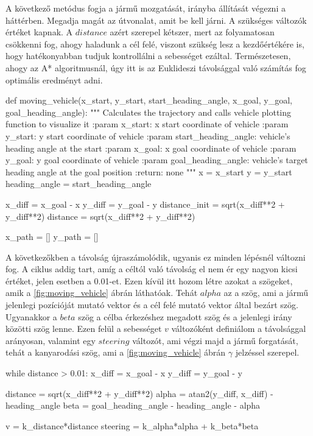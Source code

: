 \bigskip

A következő metódus fogja a jármű mozgatását, irányba állítását végezni a háttérben. Megadja magát az útvonalat, amit be kell járni. A szükséges változók értéket kapnak. A $ distance $ azért szerepel kétszer, mert az folyamatosan csökkenni fog, ahogy haladunk a cél felé, viszont szükség lesz a kezdőértékére is, hogy hatékonyabban tudjuk kontrollálni a sebességet ezáltal. Természetesen, ahogy az A* algoritmusnál, úgy itt is az Euklideszi távolsággal való számítás fog optimális eredményt adni.

\begin{python}
def moving_vehicle(x_start, y_start, start_heading_angle, x_goal,
 y_goal, goal_heading_angle):
    """
    Calculates the trajectory and calls vehicle plotting
    function to visualize it
    :param x_start: x start coordinate of vehicle
    :param y_start: y start coordinate of vehicle
    :param start_heading_angle: vehicle's heading angle at the start
    :param x_goal: x goal coordinate of vehicle
    :param y_goal: y goal coordinate of vehicle
    :param goal_heading_angle: vehicle's target heading angle
    at the goal position
    :return: none
    """
    x = x_start
    y = y_start
    heading_angle = start_heading_angle

    x_diff = x_goal - x
    y_diff = y_goal - y
    distance_init = sqrt(x_diff**2 + y_diff**2)
    distance = sqrt(x_diff**2 + y_diff**2)

    x_path = []
    y_path = []
\end{python}

\bigskip

A következőkben a távolság újraszámolódik, ugyanis ez minden lépésnél változni fog. A ciklus addig tart, amíg a céltól való távolság el nem ér egy nagyon kicsi értéket, jelen esetben a 0.01-et. Ezen kívül itt hozom létre azokat a szögeket, amik a \ref{fig:moving_vehicle} ábrán láthatóak. Tehát $ alpha $ az a szög, ami a jármű jelenlegi pozícióját mutató vektor és a cél felé mutató vektor által bezárt szög. Ugyanakkor a $ beta $ szög a célba érkezéshez megadott szög és a jelenlegi irány közötti szög lenne. Ezen felül a sebességet $ v $ változóként definiálom a távolsággal arányosan, valamint egy $ steering $ változót, ami végzi majd a jármű forgatását, tehát a kanyarodási szög, ami a \ref{fig:moving_vehicle} ábrán $ \gamma $ jelzéssel szerepel.

\begin{python}
while distance > 0.01:
        x_diff = x_goal - x
        y_diff = y_goal - y

        distance = sqrt(x_diff**2 + y_diff**2)
        alpha = atan2(y_diff, x_diff) - heading_angle
        beta = goal_heading_angle - heading_angle - alpha

        v = k_distance*distance
        steering = k_alpha*alpha + k_beta*beta
\end{python}

